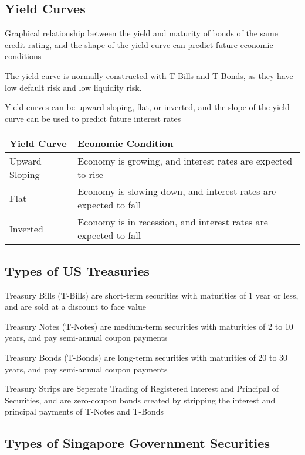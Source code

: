 \subsection{Yield Curves}
Graphical relationship between the yield and maturity of bonds of the same credit rating, and the shape of the yield curve can predict future economic conditions

\begin{callout}
	The yield curve is normally constructed with T-Bills and T-Bonds, as they have low default risk and low liquidity risk.
\end{callout}

Yield curves can be upward sloping, flat, or inverted, and the slope of the yield curve can be used to predict future interest rates

\begin{tabularx}{\linewidth}{X X}
\toprule
\textbf{Yield Curve} & \textbf{Economic Condition} \\
\midrule
Upward Sloping & Economy is growing, and interest rates are expected to rise \\
\midrule
Flat & Economy is slowing down, and interest rates are expected to fall \\
\midrule
Inverted & Economy is in recession, and interest rates are expected to fall \\
\bottomrule
\end{tabularx}

\subsection{Types of US Treasuries}

Treasury Bills (T-Bills) are short-term securities with maturities of 1 year or less, and are sold at a discount to face value

Treasury Notes (T-Notes) are medium-term securities with maturities of 2 to 10 years, and pay semi-annual coupon payments

Treasury Bonds (T-Bonds) are long-term securities with maturities of 20 to 30 years, and pay semi-annual coupon payments

Treasury Strips are Seperate Trading of Registered Interest and Principal of Securities, and are zero-coupon bonds created by stripping the interest and principal payments of T-Notes and T-Bonds

\subsection{Types of Singapore Government Securities}

